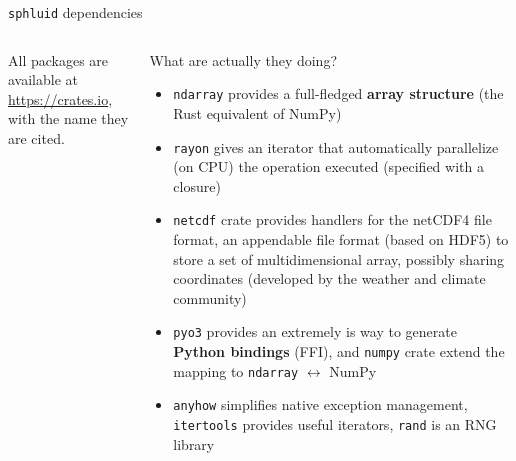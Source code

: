 \documentclass[9pt]{beamer}
\newcommand{\sphluid}{\texttt{sphluid}\xspace}
\begin{document}
\begin{frame}[fragile]{\sphluid dependencies}
\begin{columns}
\begin{column}{0.5\textwidth}
            All packages are available at \url{https://crates.io}, with the
            name they are cited.
            \vspace*{10pt}
        \end{column}
        \begin{column}{0.5\textwidth}
            What are actually they doing?
            \begin{itemize}
                \item \texttt{ndarray} provides a full-fledged
                  \alert{\textbf{array structure}} (the Rust equivalent of
                  NumPy)
                \item \texttt{rayon} gives an iterator that automatically
                  parallelize (on CPU) the operation executed (specified with
                  a closure)
                \item \texttt{netcdf} crate provides handlers for the netCDF4
                  file format, an appendable file format (based on HDF5) to
                  store a set of multidimensional array, possibly sharing
                  coordinates (developed by the weather and climate community)
                \item \texttt{pyo3} provides an extremely is way to generate
                  \alert{\textbf{Python bindings}} (FFI), and \texttt{numpy}
                  crate extend the mapping to \texttt{ndarray}
                  $\leftrightarrow$ NumPy
                \item \texttt{anyhow} simplifies native exception management,
                  \texttt{itertools} provides useful iterators, \texttt{rand}
                  is an RNG library
            \end{itemize}
        \end{column}
    \end{columns}
\end{frame}
\end{document}
